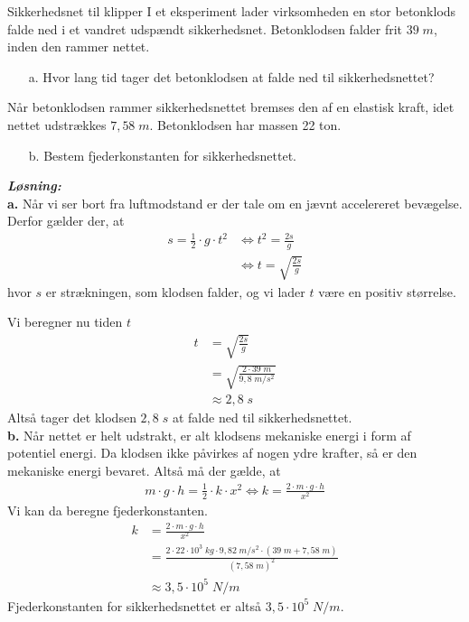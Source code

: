 \documentclass{report}
\newcommand{\sol}{\setlength{\parindent}{0cm}\textbf{\textit{Løsning:}}\setlength{\parindent}{1cm}}
\begin{document}
\begin{question}{Sikkerhedsnet til klipper}{}
I et eksperiment lader virksomheden en stor betonklods falde ned i et vandret udspændt sikkerhedsnet. Betonklodsen falder frit $39 \;\unit{ m}$, inden den rammer nettet. 
\begin{itemize}
  \item[a.] Hvor lang tid tager det betonklodsen at falde ned til sikkerhedsnettet?
\end{itemize}
Når betonklodsen rammer sikkerhedsnettet bremses den af en elastisk kraft, idet nettet udstrækkes $7,58 \;\unit{m} $. Betonklodsen har massen 22 ton.
\begin{itemize}
  \item[b.] Bestem fjederkonstanten for sikkerhedsnettet.
\end{itemize}
\end{question}
\sol \\
\textbf{a.}
Når vi ser bort fra luftmodstand er der tale om en jævnt accelereret bevægelse.
Derfor gælder der, at 
\begin{equation*}
\begin{split}
  s=\frac{1}{2} \cdot g \cdot t^2 &\iff t^2=\frac{2s}{g}\\
  &\iff t=\sqrt{\frac{2s}{g}} 
\end{split}
\end{equation*}
hvor $s$ er strækningen, som klodsen falder, og vi lader $t$ være en positiv størrelse. 

Vi beregner nu tiden $t$
\begin{equation*}
\begin{split}
  t&=\sqrt{\frac{2s}{g}} \\
  &=\sqrt{\frac{2 \cdot 39 \;\unit{m} }{9,8 \;\unit{m/s^2} }} \\
  &\approx 2,8 \;\unit{s} 
\end{split}
\end{equation*}
Altså tager det klodsen $2,8 \;\unit{s} $ at falde ned til sikkerhedsnettet.\\[1ex]
\textbf{b.}
Når nettet er helt udstrakt, er alt klodsens mekaniske energi i form af potentiel energi.
Da klodsen ikke påvirkes af nogen ydre krafter, så er den mekaniske energi bevaret.
Altså må der gælde, at 
\begin{equation*}
\begin{split}
  m \cdot g \cdot h = \frac{1}{2} \cdot k \cdot x^2 \iff k = \frac{2 \cdot m \cdot g \cdot h}{x^2}
\end{split}
\end{equation*}
Vi kan da beregne fjederkonstanten.
\begin{equation*}
\begin{split}
  k &= \frac{2 \cdot m \cdot g \cdot h}{x^2}\\ 
  &=\frac{2 \cdot 22 \cdot 10^3 \;\unit{kg} \cdot 9,82 \;\unit{m/s^2} \cdot \left(39 \;\unit{m} + 7,58 \;\unit{m} \right) }{\left(7,58 \;\unit{m} \right)^2}\\
  &\approx 3,5 \cdot 10^5 \;\unit{N/m} 
\end{split}
\end{equation*}
Fjederkonstanten for sikkerhedsnettet er altså $3,5 \cdot 10^5 \;\unit{N/m} $.
\end{document}
